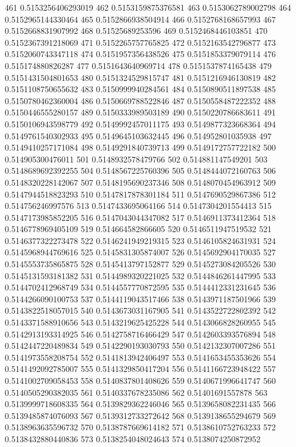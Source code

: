 461 0.5153256406293019
462 0.5153159875376581
463 0.5153062789002798
464 0.5152965144330464
465 0.5152866938504914
466 0.5152768168657993
467 0.5152668831907992
468 0.51525689253596
469 0.5152468446103851
470 0.5152367391218069
471 0.5152265757765825
472 0.5152163542796877
473 0.5152060743347118
474 0.5151957356438526
475 0.5151853379079114
476 0.515174880826287
477 0.5151643640969714
478 0.5151537874165438
479 0.5151431504801653
480 0.5151324529815747
481 0.5151216946130819
482 0.5151108750655632
483 0.5150999940284561
484 0.5150890511897538
485 0.5150780462360004
486 0.5150669788522846
487 0.5150558487222352
488 0.5150446555280157
489 0.5150333989503189
490 0.5150220786683611
491 0.5150106943598779
492 0.5149992457011175
493 0.5149877323668364
494 0.5149761540302933
495 0.5149645103632445
496 0.514952801035938
497 0.5149410257171084
498 0.5149291840739713
499 0.5149172757722182
500 0.514905300476011
501 0.5148932578479766
502 0.514881147549201
503 0.5148689692392255
504 0.5148567225760396
505 0.5148444072160763
506 0.5148320228142067
507 0.5148195690237346
508 0.5148070454963912
509 0.5147944518823293
510 0.5147817878301184
511 0.5147690529867386
512 0.514756246997576
513 0.5147433695064166
514 0.5147304201554413
515 0.5147173985852205
516 0.5147043044347082
517 0.5146911373412364
518 0.5146778969405109
519 0.514664582866605
520 0.5146511947519532
521 0.5146377322273478
522 0.5146241949219315
523 0.5146105824631931
524 0.5145968944769616
525 0.5145831305874007
526 0.5145692904170035
527 0.5145553735865875
528 0.5145413797152877
529 0.5145273084205526
530 0.5145131593181382
531 0.5144989320221025
532 0.5144846261447995
533 0.5144702412968749
534 0.5144557770872595
535 0.5144412331231645
536 0.5144266090100753
537 0.5144119043517466
538 0.5143971187501966
539 0.5143822518057015
540 0.5143673031167905
541 0.5143522722802392
542 0.5143371588910656
543 0.5143219625425228
544 0.5143066828260955
545 0.5142913193314925
546 0.5142758716466429
547 0.5142603393576894
548 0.5142447220489834
549 0.5142290193030793
550 0.5142132307007286
551 0.5141973558208754
552 0.5141813942406497
553 0.5141653455353626
554 0.5141492092785007
555 0.5141329850417204
556 0.5141166723948422
557 0.5141002709058453
558 0.5140837801408626
559 0.5140671996641747
560 0.5140505290382035
561 0.5140337678235086
562 0.51401691557878
563 0.5139999718608335
564 0.5139829362246046
565 0.5139658082231435
566 0.5139485874076093
567 0.5139312733272642
568 0.5139138655294679
569 0.5138963635596732
570 0.5138787669614182
571 0.5138610752763233
572 0.5138432880440836
573 0.5138254048024643
574 0.5138074250872952
